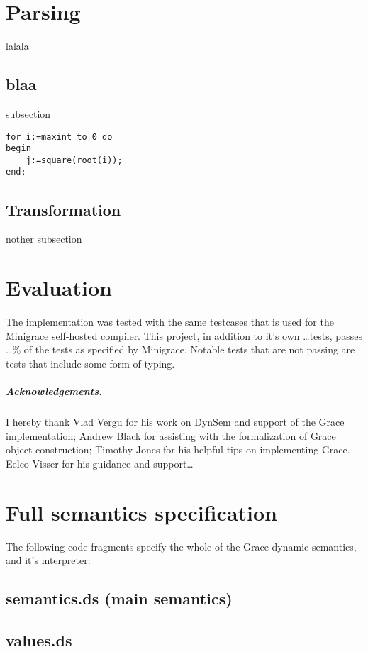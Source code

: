 \documentclass[a4paper,UKenglish]{lipics-v2016}
\begin{document}
\section{Parsing}
lalala

\subsection{blaa}
subsection

\begin{lstlisting}[caption={Useless code},label=list:8-6,captionpos=t,float,abovecaptionskip=-\medskipamount]
for i:=maxint to 0 do 
begin 
    j:=square(root(i));
end;
\end{lstlisting}

\subsection{Transformation}
nother subsection

\section{Evaluation}
The implementation was tested with the same testcases that is used for the Minigrace\cite{minigrace} self-hosted compiler. This project, in addition to it's own \dots tests, passes \dots \% of the tests as specified by Minigrace. Notable tests that are not passing are tests that include some form of typing.

\subparagraph*{Acknowledgements.}

I hereby thank Vlad Vergu for his work on DynSem and support of the Grace implementation; Andrew Black for assisting with the formalization of Grace object construction; Timothy Jones for his helpful tips on implementing Grace. Eelco Visser for his guidance and support\dots

\appendix
\section{Full semantics specification}
The following code fragments specify the whole of the Grace dynamic semantics, and it's interpreter:
\subsection{semantics.ds (main semantics)}

\subsection{values.ds}

\end{document}
